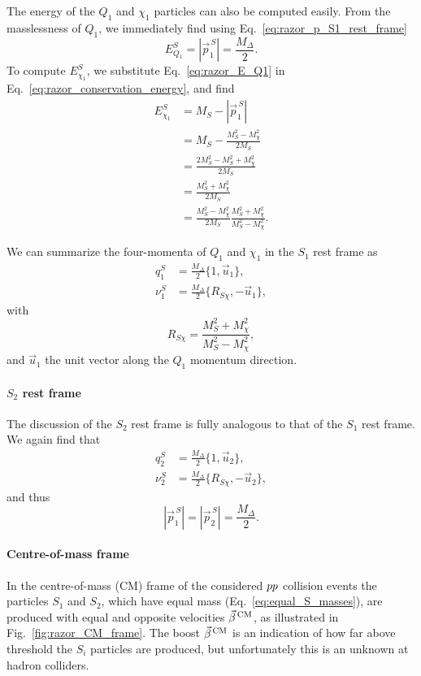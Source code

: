 The energy of the $Q_1$ and $\chi_1$ particles can also be computed easily. 
From the masslessness of $Q_1$, we immediately find using Eq.~\ref{eq:razor_p_S1_rest_frame}
\begin{equation}
  E^S_{Q_1} = |\vec{p}^{\,S}_1| = \frac{M_\Delta}{2}. \label{eq:razor_E_Q1}
\end{equation}
To compute $E^S_{\chi_1}$, we substitute Eq.~\ref{eq:razor_E_Q1} in 
Eq.~\ref{eq:razor_conservation_energy}, and find 
\begin{align}
  E^S_{\chi_1} &= M_S - |\vec{p}^{\,S}_1|\\
	       &= M_S - \frac{M_S^2 -M_{\chi}^2}{2 M_S} \\
	       &= \frac{2M_S^2 - M_S^2 + M_{\chi}^2}{2 M_S} \\
	       &= \frac{M_S^2 + M_{\chi}^2}{2 M_S} \\
	       &= \frac{M_S^2 - M_{\chi}^2}{2 M_S} \frac{M_S^2 + M_{\chi}^2}{M_S^2 - M_{\chi}^2} .
\end{align}

We can summarize the four-momenta of $Q_1$ and $\chi_1$ in the $S_1$ rest frame as
\begin{align}
  q_1^S   &= \frac{M_\Delta}{2} \{ 1, \vec{u}_1\} , \\  
  \nu_1^S &= \frac{M_\Delta}{2} \{ R_{S\chi}, -\vec{u}_1\} ,
\end{align}
with $$R_{S\chi} = \frac{M_S^2 + M_{\chi}^2}{M_S^2 - M_{\chi}^2},$$ and $\vec{u}_1$ the unit
vector along the $Q_1$ momentum direction.



\paragraph{$S_2$ rest frame}
The discussion of the $S_2$ rest frame is fully analogous to that of the $S_1$ rest frame. We
again find that
\begin{align}
  q_2^S   &= \frac{M_\Delta}{2} \{ 1, \vec{u}_2\} , \\  
  \nu_2^S &= \frac{M_\Delta}{2} \{ R_{S\chi}, -\vec{u}_2\} ,
\end{align}
and thus
\begin{equation}
  |\vec{p}^{\,S}_1| = |\vec{p}^{\,S}_2| = \frac{M_\Delta}{2} . \label{eq:razor_equal_momenta}
\end{equation}


\paragraph{Centre-of-mass frame}
In the centre-of-mass (CM) frame of the considered ${p}{p}$ collision events the particles $S_1$
and $S_2$, which have equal mass (Eq.~\ref{eq:equal_S_masses}), are produced with equal and opposite
velocities $\vec{\beta}^{\,\textrm{CM}}$, as illustrated in Fig.~\ref{fig:razor_CM_frame}. The boost $\vec{\beta}^{\,\textrm{CM}}$ is an
indication of how far above threshold the $S_i$ particles are produced, but unfortunately this is
an unknown at hadron colliders. 

